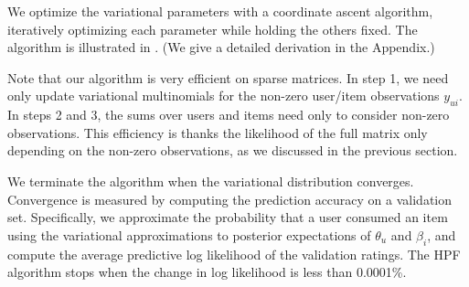 
We optimize the variational parameters with a coordinate ascent
algorithm, iteratively optimizing each parameter while holding the
others fixed.  The algorithm is illustrated in .  (We
give a detailed derivation in the Appendix.)

Note that our algorithm is very efficient on sparse matrices. In step
1, we need only update variational multinomials for the non-zero
user/item observations $y_{ui}$.  In steps 2 and 3, the sums over
users and items need only to consider non-zero observations.  This
efficiency is thanks the likelihood of the full matrix only depending
on the non-zero observations, as we discussed in the previous section.





We terminate the algorithm when the variational distribution
converges. Convergence is measured by computing the prediction
accuracy on a validation set.  Specifically, we approximate the
probability that a user consumed an item using the variational
approximations to posterior expectations of $\theta_u$ and $\beta_i$,
and compute the average predictive log likelihood of the validation
ratings. The HPF algorithm stops when the change in log likelihood is
less than 0.0001\%.



